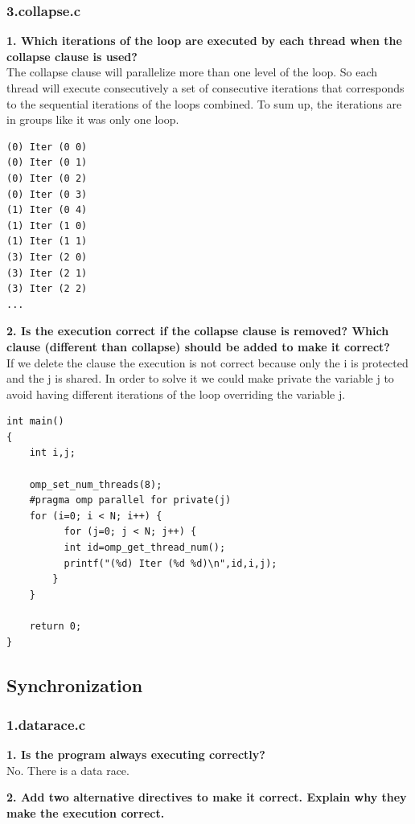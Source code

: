 \documentclass[12]{article}
\begin{document}
\subsubsection{3.collapse.c}
\textbf{1. Which iterations of the loop are executed by each thread when the collapse clause is used?}
\\
The collapse clause will parallelize more than one level of the loop. So each thread will execute consecutively a set of consecutive iterations that corresponds to the sequential iterations of the loops combined. To sum up, the iterations are in groups like it was only one loop. 
\\
\begin{lstlisting}[frame=single]
(0) Iter (0 0)
(0) Iter (0 1)
(0) Iter (0 2)
(0) Iter (0 3)
(1) Iter (0 4)
(1) Iter (1 0)
(1) Iter (1 1)
(3) Iter (2 0)
(3) Iter (2 1)
(3) Iter (2 2)
...
\end{lstlisting}
\textbf{2. Is the execution correct if the collapse clause is removed? Which clause (different than
collapse) should be added to make it correct?}
\\
If we delete the clause the execution is not correct because only the i is protected and the j is shared. In order to solve it we could make private the variable j to avoid having different iterations of the loop overriding the variable j.
\\
\begin{lstlisting}[frame=single]
int main()
{
    int i,j;

    omp_set_num_threads(8);
    #pragma omp parallel for private(j)
    for (i=0; i < N; i++) {
          for (j=0; j < N; j++) {
          int id=omp_get_thread_num();
          printf("(%d) Iter (%d %d)\n",id,i,j);
        }
    }

    return 0;
}

\end{lstlisting}
 
\subsection{Synchronization}
\subsubsection{1.datarace.c} 
\textbf{1. Is the program always executing correctly?}
\\
No. There is a data race.
\\
\medskip

\textbf{2. Add two alternative directives to make it correct. Explain why they make the execution correct.}
\\
\medskip
\end{document}
